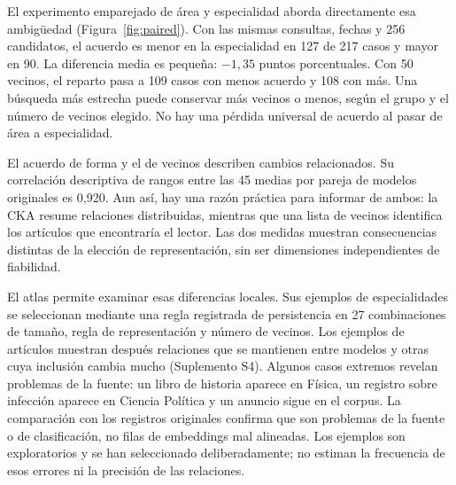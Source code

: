 \documentclass[12pt]{article}
\begin{document}
El experimento emparejado de área y especialidad aborda directamente esa ambigüedad (Figura~\ref{fig:paired}). Con las mismas consultas, fechas y 256 candidatos, el acuerdo es menor en la especialidad en 127 de 217 casos y mayor en 90. La diferencia media es pequeña: $-1{,}35$ puntos porcentuales. Con 50 vecinos, el reparto pasa a 109 casos con menos acuerdo y 108 con más. Una búsqueda más estrecha puede conservar más vecinos o menos, según el grupo y el número de vecinos elegido. No hay una pérdida universal de acuerdo al pasar de área a especialidad.

El acuerdo de forma y el de vecinos describen cambios relacionados. Su correlación descriptiva de rangos entre las 45 medias por pareja de modelos originales es 0,920. Aun así, hay una razón práctica para informar de ambos: la CKA resume relaciones distribuidas, mientras que una lista de vecinos identifica los artículos que encontraría el lector. Las dos medidas muestran consecuencias distintas de la elección de representación, sin ser dimensiones independientes de fiabilidad.

El atlas permite examinar esas diferencias locales. Sus ejemplos de especialidades se seleccionan mediante una regla registrada de persistencia en 27 combinaciones de tamaño, regla de representación y número de vecinos. Los ejemplos de artículos muestran después relaciones que se mantienen entre modelos y otras cuya inclusión cambia mucho (Suplemento S4). Algunos casos extremos revelan problemas de la fuente: un libro de historia aparece en Física, un registro sobre infección aparece en Ciencia Política y un anuncio sigue en el corpus. La comparación con los registros originales confirma que son problemas de la fuente o de clasificación, no filas de embeddings mal alineadas. Los ejemplos son exploratorios y se han seleccionado deliberadamente; no estiman la frecuencia de esos errores ni la precisión de las relaciones.
\end{document}
